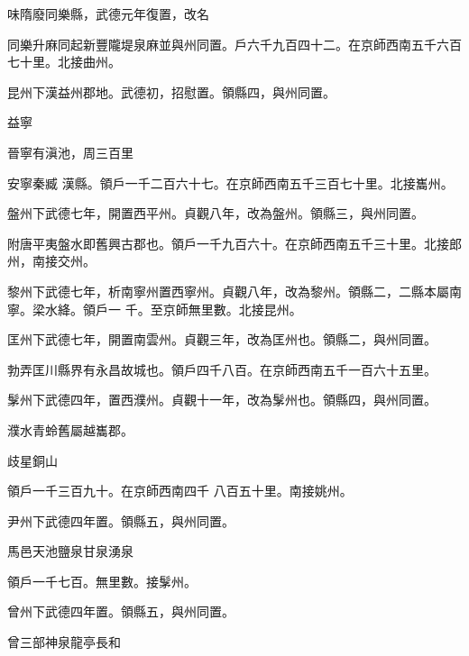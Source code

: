 \begin{pinyinscope}
 味隋廢同樂縣，武德元年復置，改名



 同樂升麻同起新豐隴堤泉麻並與州同置。戶六千九百四十二。在京師西南五千六百七十里。北接曲州。



 昆州下漢益州郡地。武德初，招慰置。領縣四，與州同置。



 益寧



 晉寧有滇池，周三百里



 安寧秦臧
 漢縣。領戶一千二百六十七。在京師西南五千三百七十里。北接巂州。



 盤州下武德七年，開置西平州。貞觀八年，改為盤州。領縣三，與州同置。



 附唐平夷盤水即舊興古郡也。領戶一千九百六十。在京師西南五千三十里。北接郎州，南接交州。



 黎州下武德七年，析南寧州置西寧州。貞觀八年，改為黎州。領縣二，二縣本屬南寧。梁水絳。領戶一
 千。至京師無里數。北接昆州。



 匡州下武德七年，開置南雲州。貞觀三年，改為匡州也。領縣二，與州同置。



 勃弄匡川縣界有永昌故城也。領戶四千八百。在京師西南五千一百六十五里。



 髳州下武德四年，置西濮州。貞觀十一年，改為髳州也。領縣四，與州同置。



 濮水青蛉舊屬越巂郡。



 歧星銅山



 領戶一千三百九十。在京師西南四千
 八百五十里。南接姚州。



 尹州下武德四年置。領縣五，與州同置。



 馬邑天池鹽泉甘泉湧泉



 領戶一千七百。無里數。接髳州。



 曾州下武德四年置。領縣五，與州同置。



 曾三部神泉龍亭長和




\end{pinyinscope}
